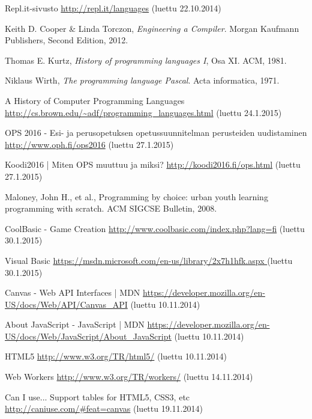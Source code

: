 
\begin{thebibliography}{99}

	Repl.it-sivusto \url{http://repl.it/languages} (luettu 22.10.2014)

	Keith D. Cooper \& Linda Torczon,
	\emph{Engineering a Compiler}.
	Morgan Kaufmann Publishers,
	Second Edition,
	2012.

	Thomas E. Kurtz,
	\emph{History of programming languages I}, Osa XI.
	ACM,
	1981.

	Niklaus Wirth,
	\emph{The programming language Pascal}.
	Acta informatica,
	1971.
	
	A History of Computer Programming Languages \url{http://cs.brown.edu/~adf/programming_languages.html} (luettu 24.1.2015)
	
	OPS 2016 - Esi- ja perusopetuksen opetussuunnitelman perusteiden uudistaminen \url{http://www.oph.fi/ops2016} (luettu 27.1.2015)

	Koodi2016 | Miten OPS muuttuu ja miksi? \url{http://koodi2016.fi/ops.html} (luettu 27.1.2015)

	Maloney, John H., et al.,
	Programming by choice: urban youth learning programming with scratch.
	ACM SIGCSE Bulletin,
	2008.

	CoolBasic - Game Creation \url{http://www.coolbasic.com/index.php?lang=fi} (luettu 30.1.2015)
	
	Visual Basic \url{https://msdn.microsoft.com/en-us/library/2x7h1hfk.aspx
} (luettu 30.1.2015)
	
	Canvas - Web API Interfaces | MDN \url{https://developer.mozilla.org/en-US/docs/Web/API/Canvas_API} (luettu 10.11.2014)

	About JavaScript - JavaScript | MDN \url{https://developer.mozilla.org/en-US/docs/Web/JavaScript/About_JavaScript} (luettu 10.11.2014)
	
	HTML5 \url{http://www.w3.org/TR/html5/} (luettu 10.11.2014)

	Web Workers \url{http://www.w3.org/TR/workers/} (luettu 14.11.2014)

	Can I use... Support tables for HTML5, CSS3, etc \url{http://caniuse.com/#feat=canvas} (luettu 19.11.2014)


\end{thebibliography}
